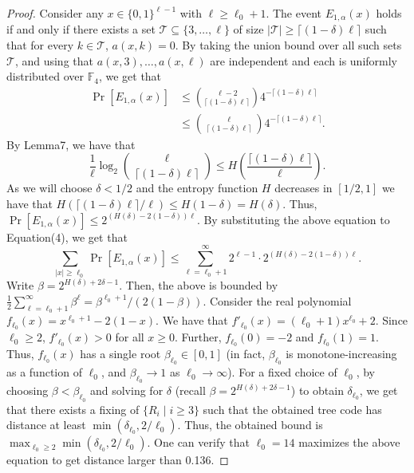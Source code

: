 \begin{proof}
Consider any $x\in\{0,1\}^{\ell-1}$ with $\ell\ge\ell_0+1$. The event $E_{1,\alpha}(x)$ holds if and only if there exists a set $\mathcal T\subseteq\{3,\ldots,\ell\}$ of size $|\mathcal T|\ge\lceil(1-\delta)\ell\rceil$ such that for every $k\in\mathcal T$, $a(x,k)=0$. By taking the union bound over all such sets $\mathcal T$, and using that $a(x,3),\ldots,a(x,\ell)$ are independent and each is uniformly distributed over $\mathbb F_4$, we get that
\begin{align*}
\Pr[E_{1,\alpha}(x)]
&\le\binom{\ell-2}{\lceil(1-\delta)\ell\rceil}4^{-\lceil(1-\delta)\ell\rceil}\\
&\le\binom\ell{\lceil(1-\delta)\ell\rceil}4^{-\lceil(1-\delta)\ell\rceil}.
\end{align*}
By Lemma7, we have that
\[
\frac1\ell\log_2\binom\ell{\lceil(1-\delta)\ell\rceil}
\le H\left(\frac{\lceil(1-\delta)\ell\rceil}{\ell}\right).
\]
As we will choose $\delta<1/2$ and the entropy function $H$ decreases in $[1/2,1]$ we have that $H(\lceil(1-\delta)\ell\rceil/\ell)\le H(1-\delta)=H(\delta)$.
Thus, $\Pr[E_{1,\alpha}(x)]\le2^{(H(\delta)-2(1-\delta))\ell}$. By substituting the above equation to Equation(4), we get that
\[
\sum_{|x|\ge\ell_0}\Pr[E_{1,\alpha}(x)]
\le\sum_{\ell=\ell_0+1}^\infty2^{\ell-1}\cdot2^{(H(\delta)-2(1-\delta))\ell}.
\]
Write $\beta=2^{H(\delta)+2\delta-1}$. Then, the above is bounded by $\frac12\sum_{\ell=\ell_0+1}^\infty\beta^\ell=\beta^{\ell_0+1}/(2(1-\beta))$.
Consider the real polynomial $f_{\ell_0}(x)=x^{\ell_0+1}-2(1-x)$. We have that $f'_{\ell_0}(x)=(\ell_0+1)x^{\ell_0}+2$.
Since $\ell_0\ge2$, $f'_{\ell_0}(x)>0$ for all $x\ge0$. Further, $f_{\ell_0}(0)=-2$ and $f_{\ell_0}(1)=1$. Thus, $f_{\ell_0}(x)$ has a single root $\beta_{\ell_0}\in[0,1]$ (in fact, $\beta_{\ell_0}$ is monotone-increasing as a function of $\ell_0$, and $\beta_{\ell_0}\to1$ as $\ell_0\to\infty$). For a fixed choice of $\ell_0$, by choosing $\beta<\beta_{\ell_0}$ and solving for $\delta$ (recall $\beta=2^{H(\delta)+2\delta-1}$) to obtain $\delta_{\ell_0}$, we get that there exists a fixing of $\{R_i\mid i\ge3\}$ such that the obtained tree code has distance at least $\min(\delta_{\ell_0},2/\ell_0)$. Thus, the obtained bound is $\max_{\ell_0\ge2}\min(\delta_{\ell_0},2/\ell_0)$.
One can verify that $\ell_0=14$ maximizes the above equation to get distance larger than 0.136.
\end{proof}
